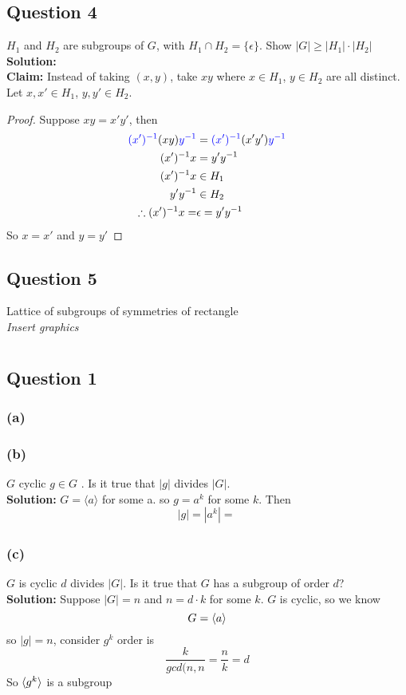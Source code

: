\documentclass[openany]{report}
\begin{document}
\section{Question 4}
$H_1$ and $H_2$ are subgroups of $G$, with $H_1 \cap H_2 = \{\epsilon\}$. Show $|G| \geq |H_1|\cdot|H_2|$\\[3ex]
\textbf{Solution:}\\[2ex]
\indent
\textbf{Claim:} Instead of taking $(x,y)$, take $xy$ where $x \in H_1$, $y \in H_2$ are all distinct. Let $x, x' \in H_1$, $y,y' \in H_2$. 
\begin{proof}
Suppose $xy = x'y'$, then 
\begin{align*}
    \textcolor{blue}{(x')^{-1}}(xy)\textcolor{blue}{y^{-1}} &= \textcolor{blue}{(x')^{-1}}(x'y')\textcolor{blue}{y^{-1}}\\
    (x')^{-1}x &= y'y^{-1}\\
    (x')^{-1}x &\in H_1\\
    y'y^{-1}&\in H_2\\
    \therefore (x')^{-1}x = &\epsilon = y'y^{-1}
\end{align*}
So $x = x'$ and $y = y'$
\end{proof}

\section{Question 5}
Lattice of subgroups of symmetries of rectangle \\
\textit{Insert graphics}


\chapter{}
\section{Question 1}
\subsection{(a)}
\subsection{(b)} $G$ cyclic $g \in G$ . Is it true that $|g|$ divides $|G|$. \\[3ex]
\textbf{Solution:} $G = \langle a \rangle$ for some a. so $g = a^k$ for some $k$. Then 
$$|g| = |a^k| = \frac{}{}$$
\subsection{(c)}
$G$ is cyclic $d$ divides $|G|$. Is it true that $G$ has a subgroup of order $d$?\\[3ex]
\textbf{Solution:} Suppose $|G| = n$ and $n = d\cdot k$ for some $k$. $G$ is cyclic, so we know 
$$G = \langle a \rangle$$
so $|g| = n$, consider $g^k$ order is 
$$\frac{k}{gcd(n,n} = \frac{n}{k} = d $$
So $\langle g^k \rangle$ is a subgroup
\end{document}
